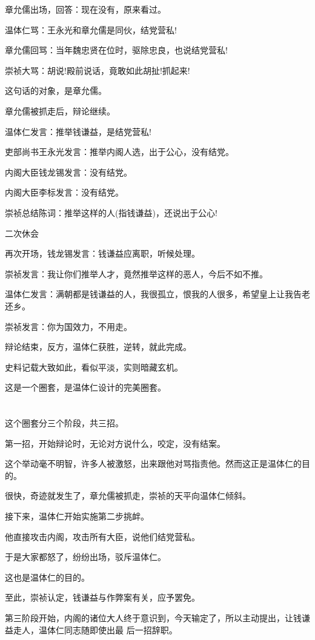 \documentclass[11pt,a4paper,onecolumn]{article}
\begin{document}
章允儒出场，回答：现在没有，原来看过。

温体仁骂：王永光和章允儒是同伙，结党营私!

章允儒回骂：当年魏忠贤在位时，驱除忠良，也说结党营私!

崇祯大骂：胡说!殿前说话，竟敢如此胡扯!抓起来!

这句话的对象，是章允儒。

章允儒被抓走后，辩论继续。

温体仁发言：推举钱谦益，是结党营私!

吏部尚书王永光发言：推举内阁人选，出于公心，没有结党。

内阁大臣钱龙锡发言：没有结党。

内阁大臣李标发言：没有结党。

崇祯总结陈词：推举这样的人(指钱谦益)，还说出于公心!

二次休会

再次开场，钱龙锡发言：钱谦益应离职，听候处理。

崇祯发言：我让你们推举人才，竟然推举这样的恶人，今后不如不推。

温体仁发言：满朝都是钱谦益的人，我很孤立，恨我的人很多，希望皇上让我告老还乡。

崇祯发言：你为国效力，不用走。

辩论结束，反方，温体仁获胜，逆转，就此完成。

史料记载大致如此，看似平淡，实则暗藏玄机。

这是一个圈套，是温体仁设计的完美圈套。

\section[\thesection]{}

这个圈套分三个阶段，共三招。

第一招，开始辩论时，无论对方说什么，咬定，没有结案。

这个举动毫不明智，许多人被激怒，出来跟他对骂指责他。然而这正是温体仁的目的。

很快，奇迹就发生了，章允儒被抓走，崇祯的天平向温体仁倾斜。

接下来，温体仁开始实施第二步\myrule 挑衅。

他直接攻击内阁，攻击所有大臣，说他们结党营私。

于是大家都怒了，纷纷出场，驳斥温体仁。

这也是温体仁的目的。

至此，崇祯认定，钱谦益与作弊案有关，应予罢免。

第三阶段开始，内阁的诸位大人终于意识到，今天输定了，所以主动提出，让钱谦益走人，温体仁同志随即使出最
后一招\myrule 辞职。
\end{document}
